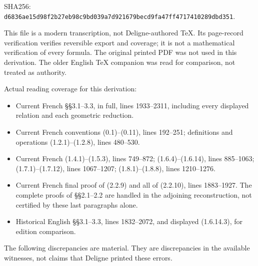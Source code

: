 \documentclass[
]{report}
\providecommand{\tightlist}{%
  \setlength{\itemsep}{0pt}\setlength{\parskip}{0pt}}
\begin{document}
SHA256:
\nolinkurl{d6836ae15d98f2b27eb98c9bd039a7d921679becd9fa47ff4717410289dbd351}.

This file is a modern transcription, not Deligne-authored TeX. Its
page-record verification verifies reversible export and coverage; it is
not a mathematical verification of every formula. The original printed
PDF was not used in this derivation. The older English TeX companion was
read for comparison, not treated as authority.

Actual reading coverage for this derivation:

\begin{itemize}
\tightlist
\item
  Current French §§3.1--3.3, in full, lines 1933--2311, including every
  displayed relation and each geometric reduction.
\item
  Current French conventions (0.1)--(0.11), lines 192--251; definitions
  and operations (1.2.1)--(1.2.8), lines 480--530.
\item
  Current French (1.4.1)--(1.5.3), lines 749--872; (1.6.4)--(1.6.14),
  lines 885--1063; (1.7.1)--(1.7.12), lines 1067--1207;
  (1.8.1)--(1.8.8), lines 1210--1276.
\item
  Current French final proof of (2.2.9) and all of (2.2.10), lines
  1883--1927. The complete proofs of §§2.1--2.2 are handled in the
  adjoining reconstruction, not certified by these last paragraphs
  alone.
\item
  Historical English §§3.1--3.3, lines 1832--2072, and displayed
  (1.6.14.3), for edition comparison.
\end{itemize}

The following discrepancies are material. They are discrepancies in the
available witnesses, not claims that Deligne printed these errors.
\end{document}
